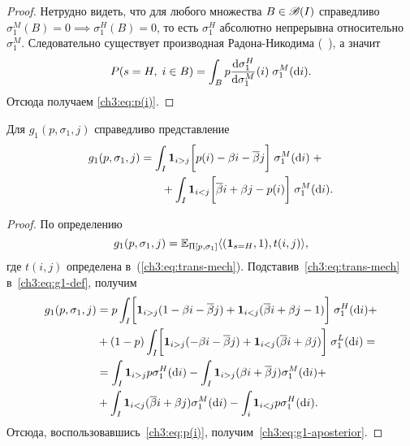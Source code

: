 {\begin{proof}
  Нетрудно видеть, что для любого множества $B \in \mathscr{B}(I)$ справедливо $\sigma^M_1(B) = 0 \implies \sigma^H_1(B) = 0$, то есть $\sigma^H_1$ абсолютно непрерывна относительно $\sigma^M_1$.
  Следовательно существует производная Радона-Никодима (\seename~\cite{kolmogorov-fomin}), а значит
  \begin{equation*}
    P(s = H, \; i \in B) =
    \int_B p \frac{\mathop{}\!\mathrm{d} \sigma^H_1}{\mathop{}\!\mathrm{d} \sigma^M_1}(i) \; \sigma^M_1(\mathop{}\!\mathrm{d} i).
  \end{equation*}
  Отсюда получаем \eqref{ch3:eq:p(i)}.
\end{proof}

\begin{proposition}
  Для $g_1(p, \sigma_1, j)$ справедливо представление
  \begin{equation}\label{ch3:eq:g1-aposterior}
    \begin{multlined}
      g_1(p, \sigma_1, j) = \int_I \Ind{i > j} \biggl[ p(i) - \Co i -
      \DCo j
      \biggr] \; \sigma^M_1(\di i) \; + \\
      + \int_I \Ind{i < j} \biggl[ \DCo i + \Co j - p(i) \biggr] \;
      \sigma^M_1(\di i).
    \end{multlined}
  \end{equation}
\end{proposition}
\begin{proof}
  По определению
  \begin{equation}\label{ch3:eq:g1-def}
    g_1(p, \sigma_1, j) = \operatorname{\mathbb{E}}_{\Pi[p, \sigma_1]} \langle
    (\mathbf{1}_{s = H}, 1), t(i, j)
    \rangle,
  \end{equation}
  где $t(i, j)$ определена в~(\ref{ch3:eq:trans-mech}).
  Подставив~\eqref{ch3:eq:trans-mech} в~\eqref{ch3:eq:g1-def}, получим
  \begin{align*}
    g_1(p, \sigma_1, j) 
    &= p \int_I \biggl[ \mathbf{1}_{i > j}(1 - \beta i - {{\overline{\beta}}} j) + \mathbf{1}_{i < j} ({{\overline{\beta}}} i + \beta j - 1) \biggr] \; \sigma^H_1(\mathop{}\!\mathrm{d} i) + \\
    &+ (1-p) \int_I \biggl[
      \mathbf{1}_{i > j} (- \beta i - {{\overline{\beta}}} j) + \mathbf{1}_{i < j}({{\overline{\beta}}} i + \beta j) 
    \biggr]
    \; \sigma^L_1(\mathop{}\!\mathrm{d} i) = \\
    &= \int_I \mathbf{1}_{i > j} p \sigma^H_1(\mathop{}\!\mathrm{d} i) -
    \int_I \mathbf{1}_{i > j} (\beta i + {{\overline{\beta}}} j) \sigma^M_1 (\mathop{}\!\mathrm{d} i) + \\
    &+ \int_I \mathbf{1}_{i < j} ({{\overline{\beta}}} i + \beta j) \sigma^M_1 (\mathop{}\!\mathrm{d} i) -
    \int_i \mathbf{1}_{i < j} p \sigma^H_1(\mathop{}\!\mathrm{d} i).
  \end{align*}
  Отсюда, воспользовавшись~\eqref{ch3:eq:p(i)}, получим~\eqref{ch3:eq:g1-aposterior}.
\end{proof}

}
